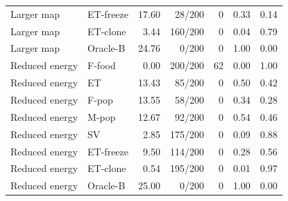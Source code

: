 {\begin{longtable}{llrrrrr}
Larger map & ET-freeze & 17.60 & 28/200 & 0 & 0.33 & 0.14\\
Larger map & ET-clone & 3.44 & 160/200 & 0 & 0.04 & 0.79\\
Larger map & Oracle-B & 24.76 & 0/200 & 0 & 1.00 & 0.00\\
Reduced energy & F-food & 0.00 & 200/200 & 62 & 0.00 & 1.00\\
Reduced energy & ET & 13.43 & 85/200 & 0 & 0.50 & 0.42\\
Reduced energy & F-pop & 13.55 & 58/200 & 0 & 0.34 & 0.28\\
Reduced energy & M-pop & 12.67 & 92/200 & 0 & 0.54 & 0.46\\
Reduced energy & SV & 2.85 & 175/200 & 0 & 0.09 & 0.88\\
Reduced energy & ET-freeze & 9.50 & 114/200 & 0 & 0.28 & 0.56\\
Reduced energy & ET-clone & 0.54 & 195/200 & 0 & 0.01 & 0.97\\
Reduced energy & Oracle-B & 25.00 & 0/200 & 0 & 1.00 & 0.00\\
\end{longtable}
}
